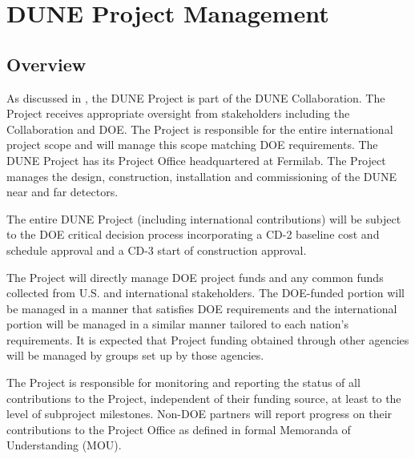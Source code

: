 \chapter{DUNE Project Management}
\label{ch:detectors-pm}

\section{Overview}




As discussed in \volintro, the DUNE Project is part of the DUNE
Collaboration. The Project receives appropriate oversight from
stakeholders including the Collaboration and DOE. The Project is
responsible for the entire international project scope and will manage
this scope matching DOE requirements. The DUNE Project has its Project Office
headquartered at Fermilab.
The Project manages the design, construction, installation and
commissioning of the DUNE near and far detectors.

The entire DUNE Project (including international contributions)
will be subject to the DOE critical decision process incorporating a
CD-2 baseline cost and schedule approval and a CD-3 start of construction approval.

The Project will directly manage DOE project funds and any common
funds collected from U.S. and international stakeholders. The
DOE-funded portion will be managed in a manner that satisfies DOE
requirements and the international portion will be managed in a
similar manner tailored to each nation's requirements. It is expected
that Project funding obtained through other agencies will be managed
by groups set up by those agencies.

The Project is responsible for monitoring and reporting the status of
all contributions to the Project, independent of their funding source,
at least to the level of subproject milestones.  Non-DOE partners will
report progress on their contributions to the Project Office as
defined in formal Memoranda of Understanding (MOU).


